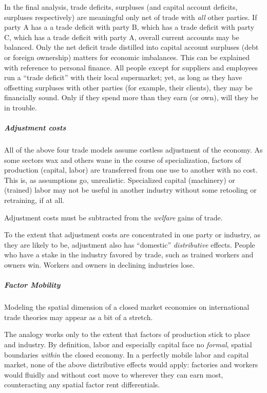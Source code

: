 In the final analysis, trade deficits, surpluses (and capital account deficits, surpluses respectively) are meaningful only net of trade with \emph{all} other parties. If party A has a a trade deficit with party B, which has a trade deficit with party C, which has a trade deficit with party A, overall current accounts may be balanced. Only the net deficit trade distilled into capital account surpluses (debt or foreign ownership) matters for economic imbalances. This can be explained with reference to personal finance. All people except for suppliers and employees run a ``trade deficit'' with their local supermarket; yet, as long as they have offsetting surpluses with other parties (for example, their clients), they may be financially sound. Only if they spend more than they earn (or own), will they be in trouble.%

\subparagraph{Adjustment costs}  \label{sec:adjustmentcosts}
All of the above four trade models assume costless adjustment of the economy. As some sectors wax and others wane in the course of specialization, factors of production (capital, labor) are transferred from one use to another with no cost. This is, as assumptions go, unrealistic. Specialized capital (machinery) or (trained) labor may not be useful in another industry without some retooling or retraining, if at all.

Adjustment costs must be subtracted from the \emph{welfare} gains of trade.

To the extent that adjustment costs are concentrated in one party or industry, as they are likely to be, adjustment also has ``domestic'' \emph{distributive} effects. People who have a stake in the industry favored by trade, such as trained workers and owners win. Workers and owners in declining industries lose.

\subparagraph{Factor Mobility}  \label{sec:factormobilitytrade}
Modeling the spatial dimension of a closed market economies on international trade theories may appear as a bit of a stretch.

The analogy works only to the extent that factors of production stick to place and industry. By definition, labor and especially capital face no \emph{formal}, spatial boundaries \emph{within} the closed economy. In a perfectly mobile labor and capital market, none of the above distributive effects would apply: factories and workers would fluidly and without cost move to wherever they can earn most, counteracting any spatial factor rent differentials.

